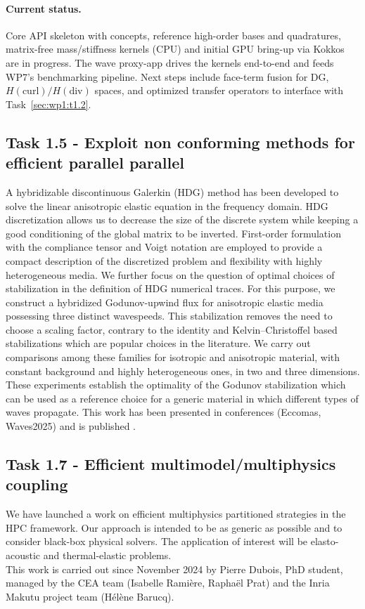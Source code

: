 \paragraph{Current status.}
Core API skeleton with concepts, reference high-order bases and quadratures, matrix-free mass/stiffness kernels (CPU) and initial GPU bring-up via Kokkos are in progress. The wave proxy-app drives the kernels end-to-end and feeds WP7’s benchmarking pipeline. Next steps include face-term fusion for DG, $H(\mathrm{curl})/H(\mathrm{div})$ spaces, and optimized transfer operators to interface with Task~\ref{sec:wp1:t1.2}.


\subsection{Task 1.5 - Exploit non conforming methods for efficient parallel parallel}
A hybridizable discontinuous Galerkin (HDG) method has been developed to solve the linear anisotropic elastic equation in the frequency domain. HDG discretization allows us to decrease the size of the discrete system while keeping a good conditioning of the global matrix to be inverted. First-order formulation with the compliance tensor and Voigt notation are employed to provide a compact description of the discretized problem and flexibility with highly heterogeneous media. We further focus on the question of optimal choices of stabilization in the definition of HDG numerical traces. For this purpose, we construct a hybridized Godunov-upwind flux for anisotropic elastic media possessing three distinct wavespeeds. This stabilization removes the need to choose a scaling factor, contrary to the identity and Kelvin–Christoffel based stabilizations which are popular choices in the literature. We carry out comparisons among these families for isotropic and anisotropic material, with constant background and highly heterogeneous ones, in two and three dimensions. These experiments establish the optimality of the Godunov stabilization which can be used as a reference choice for a generic material in which different types of waves propagate. This work has been presented in conferences (Eccomas, Waves2025) and is published \cite{pham_numerical_2024}.

\subsection{Task 1.7 -  Efficient multimodel/multiphysics coupling}
We have launched a work on efficient multiphysics partitioned strategies in the HPC framework. Our approach is intended to be as generic as possible and to consider black-box physical solvers. The application of interest will be elasto-acoustic and thermal-elastic problems.\\
This work is carried out since November 2024 by Pierre Dubois, PhD student, managed by the CEA team (Isabelle Ramière, Raphaël Prat) and the Inria Makutu project team (Hélène Barucq).

